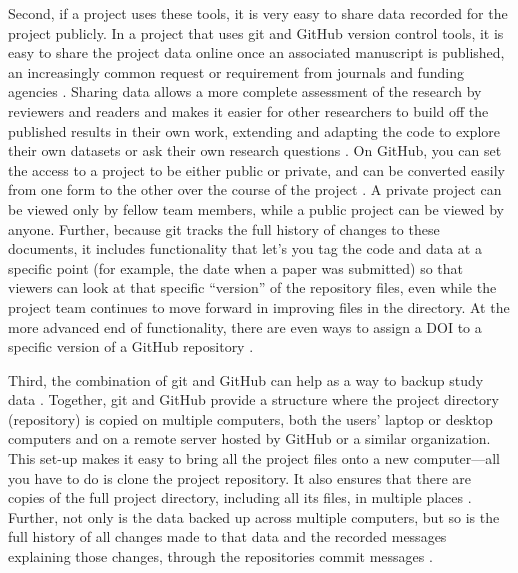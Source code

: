 \documentclass[]{tufte-book}
\begin{document}
Second, if a project uses these tools, it is very easy to share data recorded
for the project publicly. In a project that uses git and GitHub version control
tools, it is easy to share the project data online once an associated manuscript
is published, an increasingly common request or requirement from journals and
funding agencies \citep{blischak2016quick}. Sharing data allows a more complete
assessment of the research by reviewers and readers and makes it easier for
other researchers to build off the published results in their own work,
extending and adapting the code to explore their own datasets or ask their own
research questions \citep{perez2016ten}. On GitHub, you can set the access to a
project to be either public or private, and can be converted easily from one
form to the other over the course of the project \citep{metz2015github}. A private
project can be viewed only by fellow team members, while a public project can be
viewed by anyone. Further, because git tracks the full history of changes to
these documents, it includes functionality that let's you tag the code and data
at a specific point (for example, the date when a paper was submitted) so that
viewers can look at that specific ``version'' of the repository files, even while
the project team continues to move forward in improving files in the directory.
At the more advanced end of functionality, there are even ways to assign a DOI
to a specific version of a GitHub repository \citep{perez2016ten}.

Third, the combination of git and GitHub can help as a way to backup study data
\citep{blischak2016quick, perez2016ten, perkel2018git}. Together, git and GitHub
provide a structure where the project directory (repository) is copied on
multiple computers, both the users' laptop or desktop computers and on a remote
server hosted by GitHub or a similar organization. This set-up makes it easy to
bring all the project files onto a new computer---all you have to do is clone
the project repository. It also ensures that there are copies of the full
project directory, including all its files, in multiple places
\citep{blischak2016quick}. Further, not only is the data backed up across multiple
computers, but so is the full history of all changes made to that data and the
recorded messages explaining those changes, through the repositories commit
messages \citep{perez2016ten}.
\end{document}

